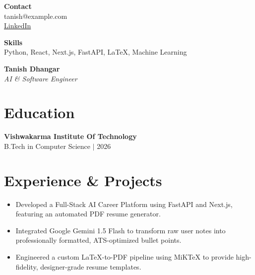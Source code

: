 \documentclass[10pt, letterpaper]{article}
\begin{document}
\pagestyle{empty}

\begin{minipage}[t]{0.30\textwidth} %
    \begin{tcolorbox}[colback=sidebarColor, colframe=sidebarColor, height=25cm, arc=0mm, top=10mm]
        {\huge \textbf{Contact}} \\
        \vspace{4mm}
        \small tanish@example.com \\
        \small \href{linkedin.com/in/tanishdhangar}{LinkedIn}
        
        \vspace{10mm}
        {\huge \textbf{Skills}} \\
        \vspace{4mm}
        \small Python, React, Next.js, FastAPI, LaTeX, Machine Learning
    \end{tcolorbox}
\end{minipage}
\hfill
\begin{minipage}[t]{0.65\textwidth} %
    \vspace{10mm}
    {\Huge \textbf{Tanish Dhangar}} \\
    {\large \textit{AI & Software Engineer}}
    
    \vspace{8mm}
    \section*{Education}
    \textbf{Vishwakarma Institute Of Technology} \\
    B.Tech in Computer Science $|$ 2026
    
    \vspace{8mm}
    \section*{Experience \& Projects}
    \begin{itemize}
    \item Developed a Full-Stack AI Career Platform using FastAPI and Next.js, featuring an automated PDF resume generator.
    \item Integrated Google Gemini 1.5 Flash to transform raw user notes into professionally formatted, ATS-optimized bullet points.
    \item Engineered a custom LaTeX-to-PDF pipeline using MiKTeX to provide high-fidelity, designer-grade resume templates.
\end{itemize}
\end{minipage}
\end{document}
